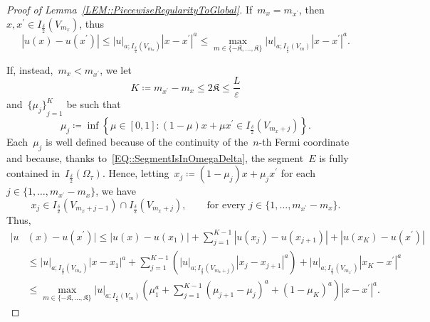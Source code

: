 \documentclass[12pt,a4paper]{amsart}
\numberwithin{equation}{section}
\theoremstyle{definition}
\theoremstyle{remark}
\newcommand{\eps}{\varepsilon}
\newcommand{\abs}[1]{\left\lvert#1\right\rvert}
\renewcommand{\leq}{\leqslant}
\begin{document}
\begin{appendix}
\begin{proof}[Proof of Lemma~\ref{LEM::PiecewiseRegularityToGlobal}]
    If~$m_x = m_{x^\prime}$, then~$x,x^\prime \in I_{\frac{\delta}{2}}(V_{m_x})$, thus
    \begin{equation}\label{EQ::xxPrimeNearSameVk}
        \abs{u(x)-u(x^\prime)} \leq \abs{u}_{a; I_{\frac{\delta}{2}}(V_{m_x})} \abs{x-x^\prime}^a \leq \max_{m \in \{-\mathfrak{K},\dots,\mathfrak{K}\}} \abs{u}_{a; I_{\frac{\delta}{2}}(V_m)}\abs{x-x^\prime}^a.
    \end{equation}

    If, instead,~$m_x < m_{x^\prime}$, we let
    \begin{equation}\label{EQ::KdefinitionAndBound}
        K \coloneq m_{x^\prime} - m_x \leq 2\mathfrak{K} \leq \frac{L}{\eps}
    \end{equation}
    and~${\{\mu_j\}}_{j=1}^K$ be such that
    \begin{equation}\label{EQ::mujSubsegmentDefinition}
        \mu_j \coloneq \inf\left\{\mu \in [0,1] \colon (1-\mu)x + \mu x^\prime \in I_{\frac{\delta}{2}}(V_{m_x + j})\right\}.
    \end{equation}
    Each~$\mu_j$ is well defined because of the continuity of the~$n$-th Fermi coordinate and because, thanks to~\eqref{EQ::SegmentIsInOmegaDelta}, the segment~$E$ is fully contained in~$I_{\frac{\delta}{2}}(\Omega_\tau)$. Hence, letting~$x_j \coloneq (1-\mu_j)x + \mu_j x^\prime$ for each~$j \in \{1,\dots,m_{x^\prime}-m_x\}$, we have
    \begin{equation}
        x_j \in I_{\frac{\delta}{2}}(V_{m_x + j - 1})\cap I_{\frac{\delta}{2}}(V_{m_x + j}),\qquad \text{for every }j \in \{1,\dots,m_{x^\prime}-m_x\}.
    \end{equation}
    Thus,
    \begin{equation}
        \begin{split}
            |u&(x)-u(x^\prime)| \leq \abs{u(x)-u(x_1)} + \sum_{j=1}^{K-1} \abs{u(x_j)-u(x_{j+1})} + \abs{u(x_K)-u(x^\prime)}\\
                &\leq \abs{u}_{a; I_{\frac{\delta}{2}}(V_{m_x})} \abs{x-x_1}^a + \sum_{j=1}^{K-1} \left( \abs{u}_{a; I_{\frac{\delta}{2}}(V_{m_x + j})} \abs{x_j-x_{j+1}}^a\right)+\abs{u}_{a; I_{\frac{\delta}{2}}(V_{m_{x^\prime}})} \abs{x_K - x^\prime}^a\\
                &\leq \max_{m \in \{-\mathfrak{K},\dots,\mathfrak{K}\}} \abs{u}_{a; I_{\frac{\delta}{2}}(V_m)} \left( \mu_1^a + \sum_{j=1}^{K-1} {(\mu_{j+1} - \mu_j)}^a + {(1-\mu_K)}^a\right)\abs{x-x^\prime}^a.
        \end{split}
    \end{equation}

\end{proof}
\end{appendix}
\end{document}
